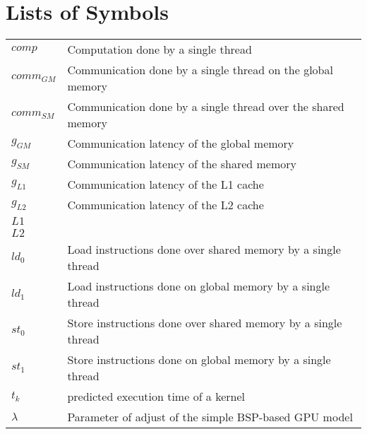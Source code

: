 \documentclass[openany,11pt,twoside,a4paper]{book}
\begin{document}
\chapter{Lists of Symbols}
\begin{tabular}{ll}
        
        $comp$      & Computation done by a single thread\\
        $comm_{GM}$      & Communication done by a single thread on the global memory\\
        $comm_{SM}$      & Communication done by a single thread over the shared memory\\
        $g_{GM}$      & Communication latency of the global memory\\
        $g_{SM}$      & Communication latency of the shared memory\\
        $g_{L1}$      & Communication latency of the L1 cache\\
        $g_{L2}$      & Communication latency of the L2 cache\\
        $L1$      & \\
        $L2$      & \\
        $ld_{0}$      & Load instructions done over shared memory by a  single thread\\
        $ld_{1}$      & Load instructions done on global memory by a  single thread\\
        $st_{0}$      & Store instructions done over shared memory by a single thread\\
        $st_{1}$      & Store instructions done on global memory by a  single thread\\
        $t_k$    & predicted execution time of a kernel\\
        $\lambda$    & Parameter of adjust of the simple BSP-based GPU model
\end{tabular}

\listoffigures %
\listoftables %

\mainmatter

\fancyhead[RE,LO]{\thesection}

\end{document}
